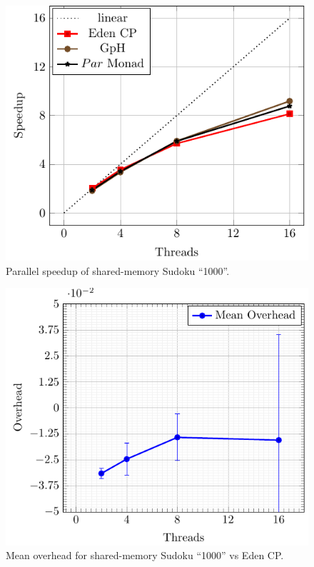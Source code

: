 \documentclass[paper=A4,twoside=true,openright,parskip=full,chapterprefix=true,headings=normal,bibliography=totoc,listof=totoc,titlepage=on,captions=tableabove,draft=false,british]{scrreprt}%
\renewcommand{\enquote}[1]{{``}#1{''}}
\begin{document}
\begin{figure}[h]
\centering
\includegraphics{src/img/perfSMSudoku.pdf}
\caption{Parallel speedup of shared-memory Sudoku
\enquote{1000}.\label{fig:perfSMSudoku}}
\end{figure}

\begin{figure}[h]
\centering
\includegraphics{src/img/overSMSudokuEden.pdf}
\caption{Mean overhead for shared-memory Sudoku \enquote{1000} vs Eden
CP.\label{fig:overSMSudokuEden}}
\end{figure}
\end{document}
